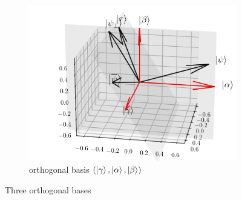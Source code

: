 \documentclass[a4paper,10pt]{book}
\numberwithin{equation}{section}
\begin{document}
\begin{figure}[h]
\begin{subfigure}[b]{0.33\columnwidth}
        \includegraphics[width=\columnwidth]{figures/basic_1.png}
        \caption{orthogonal basis $(\ket{\gamma},\ket{\alpha},\ket{\beta})$}
    \end{subfigure}
    \caption{Three orthogonal bases}
    \label{fig:basics}
\end{figure}
\end{document}
